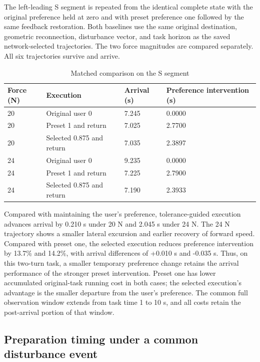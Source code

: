 \documentclass[journal]{IEEEtran}
\begin{document}
The left-leading S segment is repeated from the identical complete state with the original preference held at zero and with preset preference one followed by the same feedback restoration. Both baselines use the same original destination, geometric reconnection, disturbance vector, and task horizon as the saved network-selected trajectories. The two force magnitudes are compared separately. All six trajectories survive and arrive.



\begin{table}[tp]
\caption{Matched comparison on the S segment}
\centering
\begin{tabular}{p{}p{}p{}p{}}
\hline
Force (N) & Execution & Arrival (s) & Preference intervention (s) \\
\hline
20 & Original user 0 & 7.245 & 0.0000 \\
\hline
20 & Preset 1 and return & 7.025 & 2.7700 \\
\hline
20 & Selected 0.875 and return & 7.035 & 2.3897 \\
\hline
24 & Original user 0 & 9.235 & 0.0000 \\
\hline
24 & Preset 1 and return & 7.225 & 2.7900 \\
\hline
24 & Selected 0.875 and return & 7.190 & 2.3933 \\
\hline
\end{tabular}
\end{table}
Compared with maintaining the user's preference, tolerance-guided execution advances arrival by 0.210 s under 20 N and 2.045 s under 24 N. The 24 N trajectory shows a smaller lateral excursion and earlier recovery of forward speed. Compared with preset one, the selected execution reduces preference intervention by 13.7\% and 14.2\%, with arrival differences of +0.010 s and -0.035 s. Thus, on this two-turn task, a smaller temporary preference change retains the arrival performance of the stronger preset intervention. Preset one has lower accumulated original-task running cost in both cases; the selected execution's advantage is the smaller departure from the user's preference. The common full observation window extends from task time 1 to 10 s, and all costs retain the post-arrival portion of that window.


\subsection{Preparation timing under a common disturbance event}
\end{document}
